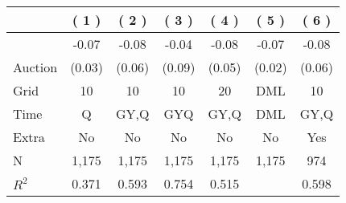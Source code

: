 
\begin{tabular}{lcccccc}
\toprule
 & ( 1 ) & ( 2 ) & ( 3 ) & ( 4 ) & ( 5 ) & ( 6 )\\
\midrule
 & -0.07 & -0.08 & -0.04 & -0.08 & -0.07 & -0.08\\

\multirow{-2}{*}{\raggedright\arraybackslash Auction} & (0.03) & (0.06) & (0.09) & (0.05) & (0.02) & (0.06)\\

\midrule
Grid & 10 & 10 & 10 & 20 & DML & 10\\

Time & Q & GY,Q & GYQ & GY,Q & DML & GY,Q\\

Extra & No & No & No & No & No & Yes\\

N & 1,175 & 1,175 & 1,175 & 1,175 & 1,175 & 974\\

$R^2$ & 0.371 & 0.593 & 0.754 & 0.515 &  & 0.598\\
\bottomrule
\end{tabular}
